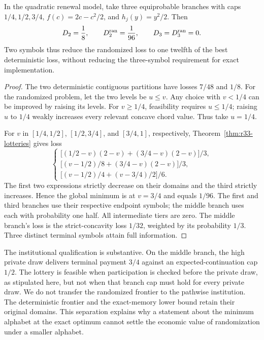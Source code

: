 \begin{proposition}\label{prop:r33-random-gap}
In the quadratic renewal model, take three equiprobable branches with caps $1/4,1/2,3/4$, $f(c)=2c-c^2/2$, and $h_j(y)=y^2/2$. Then
\begin{equation}\label{eq:r33-gap}
 D_2=\frac18,\qquad D_2^{\rm ran}=\frac1{96},\qquad D_3=D_3^{\rm ran}=0.
\end{equation}
Two symbols thus reduce the randomized loss to one twelfth of the best deterministic loss, without reducing the three-symbol requirement for exact implementation.
\end{proposition}
\begin{proof}
The two deterministic contiguous partitions have losses $7/48$ and $1/8$. For the randomized problem, let the two levels be $u\leq v$. Any choice with $v<1/4$ can be improved by raising its levels. For $v\geq1/4$, feasibility requires $u\leq1/4$; raising $u$ to $1/4$ weakly increases every relevant concave chord value. Thus take $u=1/4$.

For $v$ in $[1/4,1/2]$, $[1/2,3/4]$, and $[3/4,1]$, respectively, Theorem~\ref{thm:r33-lotteries} gives loss
\[
 \begin{cases}
 \bigl[(1/2-v)(2-v)+(3/4-v)(2-v)\bigr]/3,\\[2pt]
 \bigl[(v-1/2)/8+(3/4-v)(2-v)\bigr]/3,\\[2pt]
 \bigl[(v-1/2)/4+(v-3/4)/2\bigr]/6.
 \end{cases}
\]
The first two expressions strictly decrease on their domains and the third strictly increases. Hence the global minimum is at $v=3/4$ and equals $1/96$. The first and third branches use their respective endpoint symbols; the middle branch uses each with probability one half. All intermediate tiers are zero. The middle branch's loss is the strict-concavity loss $1/32$, weighted by its probability $1/3$. Three distinct terminal symbols attain full information.
\end{proof}

The institutional qualification is substantive. On the middle branch, the high private draw delivers terminal payment $3/4$ against an expected-continuation cap $1/2$. The lottery is feasible when participation is checked before the private draw, as stipulated here, but not when that branch cap must hold for every private draw. We do not transfer the randomized frontier to the pathwise institution. The deterministic frontier and the exact-memory lower bound retain their original domains. This separation explains why a statement about the minimum alphabet at the exact optimum cannot settle the economic value of randomization under a smaller alphabet.
